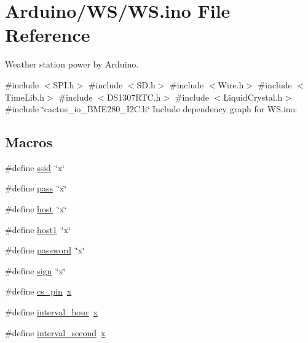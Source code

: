 \hypertarget{_w_s_8ino}{}\section{Arduino/\+W\+S/\+WS.ino File Reference}
\label{_w_s_8ino}


Weather station power by Arduino.  


{\ttfamily \#include $<$S\+P\+I.\+h$>$}\newline
{\ttfamily \#include $<$S\+D.\+h$>$}\newline
{\ttfamily \#include $<$Wire.\+h$>$}\newline
{\ttfamily \#include $<$Time\+Lib.\+h$>$}\newline
{\ttfamily \#include $<$D\+S1307\+R\+T\+C.\+h$>$}\newline
{\ttfamily \#include $<$Liquid\+Crystal.\+h$>$}\newline
{\ttfamily \#include \char`\"{}cactus\+\_\+io\+\_\+\+B\+M\+E280\+\_\+\+I2\+C.\+h\char`\"{}}\newline
Include dependency graph for W\+S.\+ino\+:
\subsection*{Macros}
\begin{DoxyCompactItemize}
\item 
\#define \hyperlink{_w_s_8ino_abd15b8fcd3b82c2827693b9fd882a206}{ssid}~\char`\"{}x\char`\"{}
\item 
\#define \hyperlink{_w_s_8ino_a9f2587d1070b8924b276ba83988d3667}{pass}~\char`\"{}x\char`\"{}
\item 
\#define \hyperlink{_w_s_8ino_ad9949162675c2cb74b115f5dfb224732}{host}~\char`\"{}x\char`\"{}
\item 
\#define \hyperlink{_w_s_8ino_a9e2e38c07417ce7edf45d45a5a6b92c9}{host1}~\char`\"{}x\char`\"{}
\item 
\#define \hyperlink{_w_s_8ino_ae59dfb8ffddb9128834034516c45e7ce}{password}~\char`\"{}x\char`\"{}
\item 
\#define \hyperlink{_w_s_8ino_a9d8dc79272f5859f2c509c88f073dbde}{sign}~\char`\"{}x\char`\"{}
\item 
\#define \hyperlink{_w_s_8ino_ad7860cb7dbe49e4f2ebde8c624b448ef}{cs\+\_\+pin}~\hyperlink{_w_s_8ino_ab06e9aa782b61ccfb42f7c48996f6ed4}{x}
\item 
\#define \hyperlink{_w_s_8ino_a4e07ce7aef83b2e94bd353d77029423e}{interval\+\_\+hour}~\hyperlink{_w_s_8ino_ab06e9aa782b61ccfb42f7c48996f6ed4}{x}
\item 
\#define \hyperlink{_w_s_8ino_a0a56e85c196bfb2b3bf61abe7f007541}{interval\+\_\+second}~\hyperlink{_w_s_8ino_ab06e9aa782b61ccfb42f7c48996f6ed4}{x}
\end{DoxyCompactItemize}
